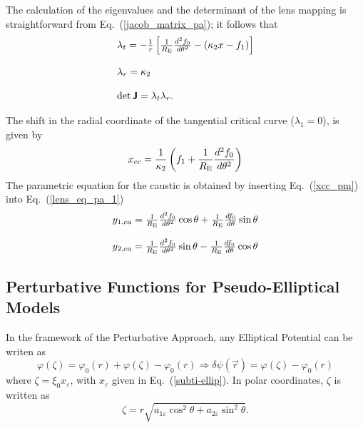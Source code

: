 \documentclass[useAMS,usenatbib]{mn2e}
\begin{document}
The calculation of the eigenvalues and the determinant of the lens mapping is straightforward from Eq.~(\ref{jacob_matrix_pa}); it follows that 
\begin{equation}\label{eigv_1-2_pa}
\begin{array}{l}
\lambda_{t}=-\frac{1}{r}\left[\frac{1}{R_{\rm E}}\frac{d^2f_0}{d\theta^2}-(\kappa_2 x -f_1)  \right]\\
\\
\lambda_{r}=\kappa_2 \\
\\
{\mathrm{det}}\,\textbf{\textsf{J}}=\lambda_t\lambda_r.\\
\end{array}
\end{equation}

The shift in the radial coordinate of the tangential critical curve ($\lambda_1=0$), is given by
\begin{equation}
x_{cc}=\frac{1}{\kappa_2}\left(f_1+\frac{1}{R_{\rm E}}\frac{d^2f_0}{d\theta^2}\right)\label{xcc_pm}
\end{equation}
The parametric equation for the caustic is obtained by inserting Eq.~(\ref{xcc_pm}) into Eq.~(\ref{lens_eq_pa_1}) 
\begin{equation}\label{ca_pm}
\begin{array}{l}
y_{1,ca}= \frac{1}{R_{\rm E}}\frac{d^2f_0}{d\theta^2}\cos{\theta}+\frac{1}{R_{\rm E}}\frac{df_0}{d\theta}\sin{\theta}\\
\\
y_{2,ca}= \frac{1}{R_{\rm E}}\frac{d^2f_0}{d\theta^2}\sin{\theta}-\frac{1}{R_{\rm E}}\frac{df_0}{d\theta}\cos{\theta}
\end{array}
\end{equation}

\subsection{Perturbative Functions for Pseudo-Elliptical Models}
In the framework of the Perturbative Approach, any Elliptical Potential can be writen as
\begin{equation}
\varphi(\zeta)=\varphi_0(r)+\varphi(\zeta)-\varphi_0(r) \Rightarrow \delta \psi(\vec{r})=\varphi(\zeta)-\varphi_0(r)
 \end{equation}
where $\zeta=\xi_0x_\varepsilon$, with $x_\varepsilon$ given in Eq.~(\ref{subti-ellip}). In polar coordinates, $\zeta$ is written as
\begin{equation}
\zeta=r\sqrt{a_{1\varepsilon}\cos^2{\theta}+a_{2\varepsilon}\sin^2{\theta}}. \label{zeta_E}
\end{equation}
\end{document}
